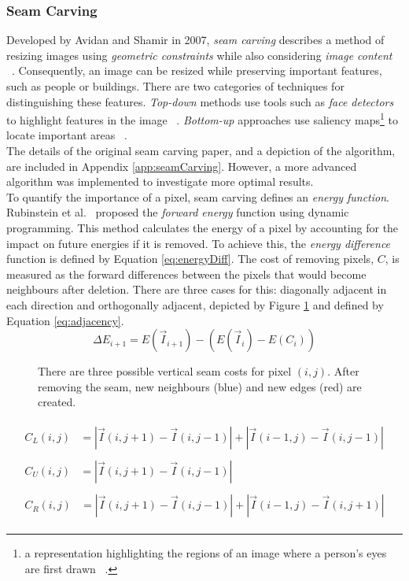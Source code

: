 \subsubsection{Seam Carving}
\label{sec:seamCarving}
\indent \indent
Developed by Avidan and Shamir in 2007, \textit{seam carving} describes a method of resizing images using \textit{geometric constraints} while also considering \textit{image content} ~\cite{SeamCarving}. Consequently, an image can be resized while preserving important features, such as people or buildings. There are two categories of techniques for distinguishing these features. \textit{Top-down} methods use tools such as \textit{face detectors} to highlight features in the image ~\cite{Viola}. \textit{Bottom-up} approaches use saliency maps\footnote{a representation highlighting the regions of an image where a person's eyes are first drawn ~\cite{Saliency}.} to locate important areas ~\cite{Itti}.
\smallskip \\ \indent
The details of the original seam carving paper, and a depiction of the algorithm, are included in Appendix \ref{app:seamCarving}. However, a more advanced algorithm was implemented to investigate more optimal results.
\smallskip \\ \indent
To quantify the importance of a pixel, seam carving defines an \textit{energy function}. Rubinstein et al.\ \cite{Rubinstein} proposed the \textit{forward energy} function using dynamic programming. This method calculates the energy of a pixel by accounting for the impact on future energies if it is removed. To achieve this, the \textit{energy difference} function is defined by Equation \ref{eq:energyDiff}. The cost of removing pixels, $C$, is measured as the forward differences between the pixels that would become neighbours after deletion. There are three cases for this: diagonally adjacent in each direction and orthogonally adjacent, depicted by Figure \ref{fig:adjacency} and defined by Equation \ref{eq:adjacency}.
\begin{equation}
    \label{eq:energyDiff}
    \Delta E_{i+1} = E(\vec{I}_{i+1}) - (E(\vec{I}_i) - E(C_i))
\end{equation}
\begin{figure}
    \scalebox{0.5}{}
    \caption[Potential Seam Costs]{There are three possible vertical seam costs for pixel $(i, j)$. After removing the seam, new neighbours (blue) and new edges (red) are created.}
    \label{fig:adjacency}
\end{figure}
\begin{align}
    \label{eq:adjacency}
    \begin{split}
        C_L(i, j) &= |\vec{I}(i, j+1) - \vec{I}(i, j-1)| + |\vec{I}(i-1, j) - \vec{I}(i, j-1)|
    \end{split} \\
    \begin{split}
        C_U(i, j) &= |\vec{I}(i, j+1) - \vec{I}(i, j-1)|
    \end{split} \\
    \begin{split}
        C_R(i, j) &= |\vec{I}(i, j+1) - \vec{I}(i, j-1)| + |\vec{I}(i-1, j) - \vec{I}(i, j+1)|
    \end{split}
\end{align}
